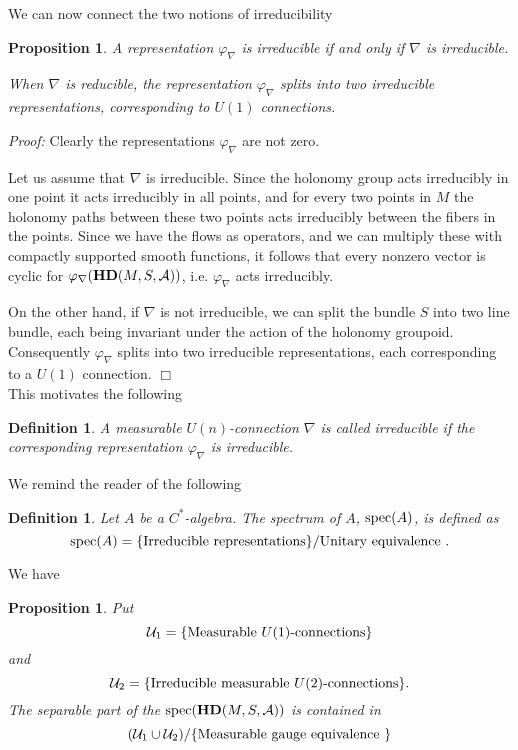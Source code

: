 \documentclass[12pt]{article}
\def\ca{{\cal A}}
\newtheorem{definition}[thm]{Definition}
\newtheorem{proposition}[thm]{Proposition}
\begin{document}
We can now connect the two notions of irreducibility
\begin{proposition}
A representation $\varphi_\nabla$ is irreducible if and only if $\nabla$ is irreducible.

When $\nabla$ is reducible, the representation $\varphi_\nabla$ splits into two irreducible representations, corresponding to $U(1)$ connections.
\end{proposition}

\textit{Proof:} Clearly the representations $\varphi_\nabla$ are not zero. 

Let us assume that $\nabla$ is irreducible. Since the holonomy group acts irreducibly in one point it acts irreducibly in all points, and for every two points in $M$ the holonomy paths between these two points acts irreducibly between the fibers in the points.  Since we have the flows as operators, and we can multiply these with compactly supported smooth functions, it follows that every nonzero vector is cyclic for $\varphi_\nabla (\mathbf{H D} (M,S,\ca))$, i.e.  $\varphi_\nabla $  acts irreducibly. 

On the other hand, if $\nabla$ is not irreducible, we can split the bundle $S$ into two line bundle, each being invariant under the action of the holonomy groupoid. Consequently $\varphi_\nabla$ splits into two irreducible representations, each corresponding to a $U(1)$ connection.
\hfill $\Box$   \\ 

This motivates the following
\begin{definition}
A measurable $U(n)$-connection $\nabla$ is called irreducible if the corresponding representation $\varphi_\nabla$ is irreducible.
\end{definition}

We remind the reader of the following

\begin{definition}
Let $A$ be a $C^*$-algebra. The spectrum of $A$, $\hbox{spec}( A)$, is defined as
$$ \hbox{spec}(A) =\{ \hbox{Irreducible representations} \} / \hbox{Unitary equivalence }   . $$ 
\end{definition}



We have
\begin{proposition} Put
$$  \mathcal{U}_1=\{ \hbox{Measurable }U(1)\hbox{-connections} \}   $$
and 
$$  \mathcal{U}_2=\{ \hbox{Irreducible measurable }U(2)\hbox{-connections} \}  . $$
The separable part of the $\hbox{spec} (\mathbf{H D} (M,S,\ca))$ is contained in 
$$ ( \mathcal{U}_1 \cup \mathcal{U}_2)/\{ \hbox{Measurable gauge equivalence }   \}   $$
\end{proposition}
\end{document}
